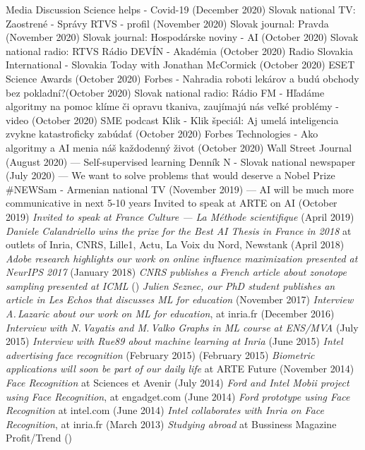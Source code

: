 \documentclass{resume}
\begin{document}
\begin{category}{Media}
\citembullet
Discussion Science helps - Covid-19 ({\sf December 2020})
\citembullet
Slovak national TV: Zaostren\' e - Správy RTVS - profil  ({\sf November 2020})
\citembullet
Slovak journal: Pravda ({\sf November 2020})
\citembullet
Slovak journal: Hospod\'arske noviny - AI ({\sf  October 2020})
\citembullet
Slovak national radio: RTVS R\'adio DEV\'IN - Akad\'emia ({\sf  October 2020})
\citembullet
Radio Slovakia International - Slovakia Today with Jonathan McCormick ({\sf  October 2020})
\citembullet
ESET Science Awards ({\sf  October 2020}) 
\citembullet
Forbes - Nahradia roboti lek\'arov a bud\'u obchody bez pokladn\'i?({\sf  October 2020})
\citembullet
Slovak national radio: Rádio FM - Hľadáme algoritmy na pomoc klíme či opravu tkaniva, zaujímajú nás veľké problémy - video ({\sf  October 2020})
\citembullet
SME podcast Klik - Klik špeciál: Aj umel\'a inteligencia zvykne katastroficky zab\'uda\v{t} ({\sf  October 2020})
\citembullet
Forbes Technologies - Ako algoritmy a AI menia n\'a\v{s}  ka\v{z}dodenný \v{z}ivot ({\sf  October 2020})
\citembullet
Wall Street Journal ({\sf  August 2020}) --- Self-supervised learning
\citembullet
Denn\' ik N - Slovak national newspaper ({\sf  July 2020}) --- We want to solve problems that would deserve a Nobel Prize
\citembullet
\#NEWSam - Armenian national TV ({\sf  November 2019}) --- AI will be much more communicative in next 5-10 years
\citembullet
Invited to speak at ARTE on AI ({\sf October 2019})
\citembullet
\emph{Invited to speak at France Culture --- La M\'ethode scientifique} ({\sf April 2019})
\citembullet
\emph{Daniele Calandriello wins the prize for the Best AI Thesis in France in 2018} 
at outlets of Inria, CNRS, Lille1,  Actu,  La Voix du Nord, Newstank
({\sf April 2018})
\citembullet
\emph{Adobe research highlights our work on online influence maximization presented at NeurIPS 2017} ({\sf January 2018})
\citembullet
\emph{CNRS publishes a French article about zonotope sampling presented at ICML} ({})
\citembullet
\emph{Julien Seznec, our PhD student publishes an article in  Les Echos that discusses ML for education} ({\sf November 2017})
\citembullet
\emph{Interview A.\,Lazaric about our work on ML for education}, at inria.fr ({\sf December 2016})
\citembullet
\emph{Interview with N.\,Vayatis and M.\,Valko Graphs in ML course at ENS/MVA} ({\sf July 2015})
\citembullet
\emph{Interview with Rue89 about machine learning at Inria} ({\sf June 2015})
\citembullet
\emph{Intel advertising face recognition} (February 2015) ({\sf February 2015})
\citembullet
\emph{Biometric applications will soon be part of our daily life} at ARTE Future ({\sf November 2014})
\citembullet
\emph{Face Recognition} at Sciences et Avenir ({\sf July 2014})
\citembullet
\emph{Ford and Intel Mobii project using Face Recognition}, at engadget.com ({\sf June 2014}) 
\citembullet
\emph{Ford prototype using Face Recognition} at intel.com ({\sf June 2014}) 
\citembullet
\emph{Intel collaborates with Inria on Face Recognition}, at inria.fr ({\sf March 2013}) 
\citembullet
\emph{Studying abroad} at Bussiness Magazine Profit/Trend  ({})
 \end{category}
\end{document}
